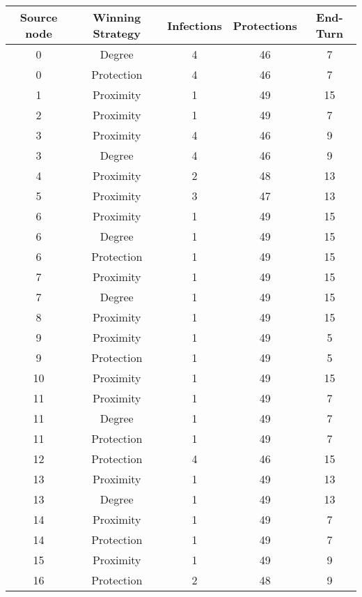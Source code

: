\documentclass[results.tex]{subfiles}
\begin{document}
\begin{center}
  \begin{tabular}{| c || c | c | c | c |}
    \hline
    {\bfseries Source node} & {\bfseries Winning Strategy} & {\bfseries Infections} & {\bfseries Protections} & {\bfseries End-Turn} \\  %
    \hline\hline
    0 & Degree & 4 & 46 & 7 \\ 
    \hline
    0 & Protection & 4 & 46 & 7 \\ 
    \hline
    1 & Proximity & 1 & 49 & 15 \\ 
    \hline
    2 & Proximity & 1 & 49 & 7 \\ 
    \hline
    3 & Proximity & 4 & 46 & 9 \\ 
    \hline
    3 & Degree & 4 & 46 & 9 \\ 
    \hline
    4 & Proximity & 2 & 48 & 13 \\ 
    \hline
    5 & Proximity & 3 & 47 & 13 \\ 
    \hline
    6 & Proximity & 1 & 49 & 15 \\ 
    \hline
    6 & Degree & 1 & 49 & 15 \\ 
    \hline
    6 & Protection & 1 & 49 & 15 \\ 
    \hline
    7 & Proximity & 1 & 49 & 15 \\ 
    \hline
    7 & Degree & 1 & 49 & 15 \\ 
    \hline
    8 & Proximity & 1 & 49 & 15 \\ 
    \hline
    9 & Proximity & 1 & 49 & 5 \\ 
    \hline
    9 & Protection & 1 & 49 & 5 \\ 
    \hline
    10 & Proximity & 1 & 49 & 15 \\ 
    \hline
    11 & Proximity & 1 & 49 & 7 \\ 
    \hline
    11 & Degree & 1 & 49 & 7 \\ 
    \hline
    11 & Protection & 1 & 49 & 7 \\ 
    \hline
    12 & Protection & 4 & 46 & 15 \\ 
    \hline
    13 & Proximity & 1 & 49 & 13 \\ 
    \hline
    13 & Degree & 1 & 49 & 13 \\ 
    \hline
    14 & Proximity & 1 & 49 & 7 \\ 
    \hline
    14 & Protection & 1 & 49 & 7 \\ 
    \hline
    15 & Proximity & 1 & 49 & 9 \\ 
    \hline
    16 & Protection & 2 & 48 & 9 \\ 

\end{tabular}
\end{center}
\end{document}
